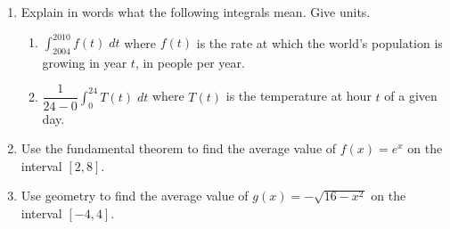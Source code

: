 \documentclass[12pt]{article}
\newcommand{\ds}{\displaystyle}
\begin{document}
\drawtitle

\begin{enumerate}
\item Explain in words what the following integrals mean.  Give units.
  \begin{enumerate}
  \item $\ds\int_{2004}^{2010} f(t)\;dt$ where $f(t)$ is the rate at
    which the world's population is growing in year $t$, in people per
    year.

    \vfill

  \item $\ds\dfrac{1}{24-0}\int_0^{24} T(t)\;dt$ where $T(t)$ is the
    temperature at hour $t$ of a given day.

    \vfill
  \end{enumerate}

\item Use the fundamental theorem to find the average value of
  $f(x)=e^x$ on the interval $[2,8]$.

  \vfill

\item Use geometry to find the average value of $g(x)=-\sqrt{16-x^2}$
  on the interval $[-4,4]$.

\vfill\vfill\vfill\vfill

\end{enumerate}
\end{document}
